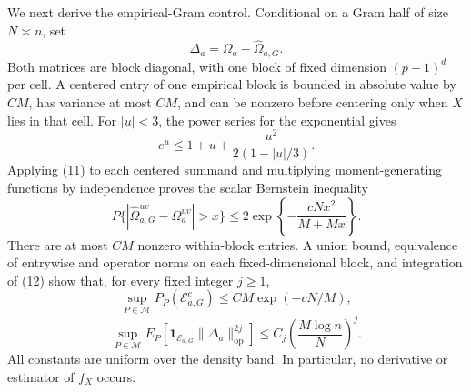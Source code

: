 We next derive the empirical-Gram control.  Conditional on a Gram half of size \(N\asymp n\), set
\[
 \Delta_a=\Omega_a-\widehat\Omega_{a,G}.
\]
Both matrices are block diagonal, with one block of fixed dimension \((p+1)^d\) per cell.  A centered entry of one empirical block is bounded in absolute value by \(CM\), has variance at most \(CM\), and can be nonzero before centering only when \(X\) lies in that cell.  For \(|u|<3\), the power series for the exponential gives
\[
 e^u\leq1+u+\frac{u^2}{2(1-|u|/3)}.
 \tag{11}
\]
Applying (11) to each centered summand and multiplying moment-generating functions by independence proves the scalar Bernstein inequality
\[
 P\{|\widehat\Omega_{a,G}^{uv}-\Omega_a^{uv}|>x\}
 \leq2\exp\left\{-\frac{cNx^2}{M+Mx}\right\}.
 \tag{12}
\]
There are at most \(CM\) nonzero within-block entries.  A union bound, equivalence of entrywise and operator norms on each fixed-dimensional block, and integration of (12) show that, for every fixed integer \(j\geq1\),
\[
 \sup_{P\in\mathcal M}P_P(\mathcal E_{a,G}^c)
 \leq CM\exp(-cN/M),
 \tag{13}
\]
\[
 \sup_{P\in\mathcal M}
 E_P\!\left[
  \mathbf 1_{\mathcal E_{a,G}}
  \|\Delta_a\|_{\mathrm{op}}^{2j}
 \right]
 \leq C_j\left(\frac{M\log n}{N}\right)^j.
 \tag{14}
\]
All constants are uniform over the density band.  In particular, no derivative or estimator of \(f_X\) occurs.

